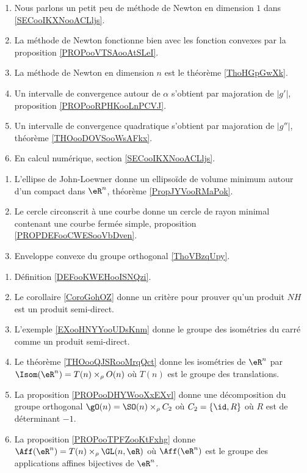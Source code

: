     \begin{enumerate}
        \item
            Nous parlons un petit peu de méthode de Newton en dimension \( 1\) dans \ref{SECooIKXNooACLljs}.
        \item
            La méthode de Newton fonctionne bien avec les fonction convexes par la proposition \ref{PROPooVTSAooAtSLeI}.
        \item
            La méthode de Newton en dimension $n$ est le théorème \ref{ThoHGpGwXk}.
       \item
            Un intervalle de convergence autour de \( \alpha\) s'obtient par majoration de \( | g' |\), proposition \ref{PROPooRPHKooLnPCVJ}.
       \item
           Un intervalle de convergence quadratique s'obtient par majoration de \( | g'' |\), théorème \ref{THOooDOVSooWsAFkx}.
       \item
           En calcul numérique, section \ref{SECooIKXNooACLljs}.
       \end{enumerate}

    \begin{enumerate}
        \item
            L'ellipse de John-Loewner donne un ellipsoïde de volume minimum autour d'un compact dans \( \eR^n\), théorème \ref{PropJYVooRMaPok}.
        \item
            Le cercle circonscrit à une courbe donne un cercle de rayon minimal contenant une courbe fermée simple, proposition \ref{PROPDEFooCWESooVbDven}.
    \item Enveloppe convexe du groupe orthogonal \ref{ThoVBzqUpy}.
        \end{enumerate}

    \begin{enumerate}
        \item
            Définition \ref{DEFooKWEHooISNQzi}.
        \item
            Le corollaire \ref{CoroGohOZ} donne un critère pour prouver qu'un produit \( NH\) est un produit semi-direct.
        \item
            L'exemple \ref{EXooHNYYooUDsKnm} donne le groupe des isométries du carré comme un produit semi-direct.
        \item
            Le théorème \ref{THOooQJSRooMrqQct} donne les isométries de \( \eR^n\) par \( \Isom(\eR^n)=T(n)\times_{\rho} O(n)\) où \( T(n)\) est le groupe des translations.
        \item
            La proposition \ref{PROPooDHYWooXxEXvl} donne une décomposition du groupe orthogonal \( \gO(n)=\SO(n)\times_{\rho} C_2\) où \( C_2=\{ \id,R \}\) où \( R\) est de déterminant \( -1\).
        \item
            La proposition \ref{PROPooTPFZooKtFxhg} donne \( \Aff(\eR^n)=T(n)\times_{\rho}\GL(n,\eR)\) où \( \Aff(\eR^n)\) est le groupe des applications affines bijectives de \( \eR^n\).
        \end{enumerate}

